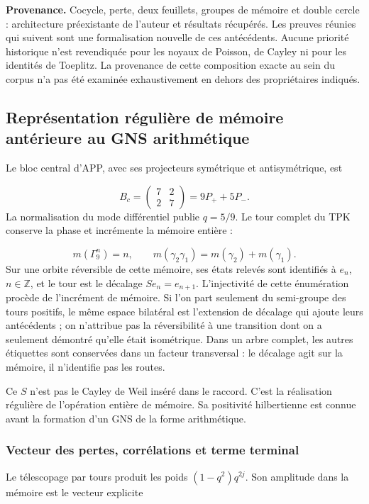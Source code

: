 \textbf{Provenance.} Cocycle, perte, deux feuillets, groupes de mémoire et double cercle : architecture préexistante de l'auteur et résultats récupérés. Les preuves réunies qui suivent sont une formalisation nouvelle de ces antécédents. Aucune priorité historique n'est revendiquée pour les noyaux de Poisson, de Cayley ni pour les identités de Toeplitz. La provenance de cette composition exacte au sein du corpus n'a pas été examinée exhaustivement en dehors des propriétaires indiqués.


\subsection{Représentation régulière de mémoire antérieure au GNS arithmétique}
\label{viii:tm-add-m2}
Le bloc central d'APP, avec ses projecteurs symétrique et antisymétrique, est

\[
B_c=\begin{pmatrix}7&2\\2&7\end{pmatrix}
=9P_++5P_-.
\]
La normalisation du mode différentiel publie \(q=5/9\). Le tour complet du TPK conserve la phase et incrémente la mémoire entière :

\[
m(\Gamma_9^n)=n,\qquad
m(\gamma_2\gamma_1)=m(\gamma_2)+m(\gamma_1).
\]
Sur une orbite réversible de cette mémoire, ses états relevés sont identifiés à \(e_n\), \(n\in\mathbb Z\), et le tour est le décalage \(Se_n=e_{n+1}\). L'injectivité de cette énumération procède de l'incrément de mémoire. Si l'on part seulement du semi-groupe des tours positifs, le même espace bilatéral est l'extension de décalage qui ajoute leurs antécédents ; on n'attribue pas la réversibilité à une transition dont on a seulement démontré qu'elle était isométrique. Dans un arbre complet, les autres étiquettes sont conservées dans un facteur transversal : le décalage agit sur la mémoire, il n'identifie pas les routes.

Ce \(S\) n'est pas le Cayley de Weil inséré dans le raccord. C'est la réalisation régulière de l'opération entière de mémoire. Sa positivité hilbertienne est connue avant la formation d'un GNS de la forme arithmétique.


\subsubsection{Vecteur des pertes, corrélations et terme terminal}
\label{viii:tm-add-m2-1}
Le télescopage par tours produit les poids \((1-q^2)q^{2j}\). Son amplitude dans la mémoire est le vecteur explicite

